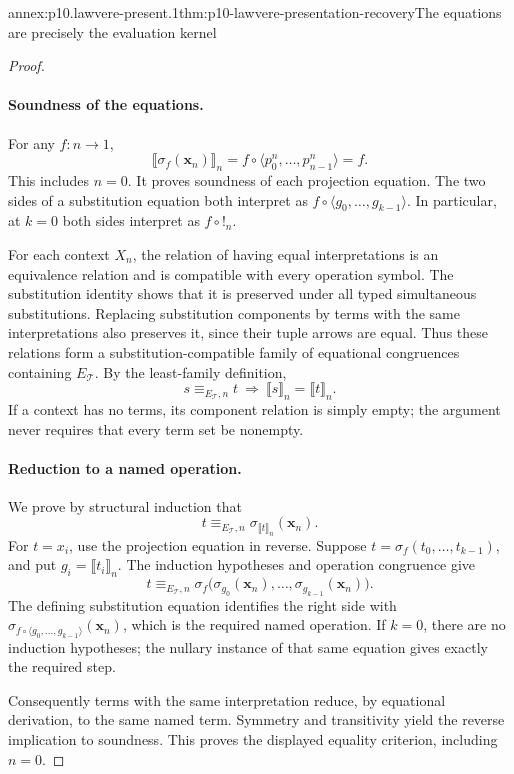 \begin{annexitem}{annex:p10.lawvere-present.1}{thm:p10-lawvere-presentation-recovery}{The equations are precisely the evaluation kernel}
\begin{proof}
\paragraph{Soundness of the equations.}
For any \(f:n\to1\),
\[
       \llbracket\sigma_f(\mathbf x_n)\rrbracket_n
             =f\circ\langle p_0^n,\ldots,p_{n-1}^n\rangle=f.
\]
This includes \(n=0\).
It proves soundness of each projection equation.
The two sides of a substitution equation both interpret as
\(f\circ\langle g_0,\ldots,g_{k-1}\rangle\).
In particular, at \(k=0\) both sides interpret as \(f\circ!_n\).

For each context \(X_n\), the relation of having equal
interpretations is an equivalence relation and is compatible
with every operation symbol.  The substitution identity shows
that it is preserved under all typed simultaneous substitutions.
Replacing substitution components by terms with the same
interpretations also preserves it, since their tuple arrows
are equal.  Thus these relations form a substitution-compatible
family of equational congruences containing \(E_{\mathcal T}\).
By the least-family definition,
\[
        s\equiv_{E_{\mathcal T},n}t
                        \ \Longrightarrow\
                     \llbracket s\rrbracket_n=\llbracket t\rrbracket_n.
\]
If a context has no terms, its component relation is simply empty;
the argument never requires that every term set be nonempty.

\paragraph{Reduction to a named operation.}
We prove by structural induction that
\[
             t\equiv_{E_{\mathcal T},n}
                           \sigma_{\llbracket t\rrbracket_n}(\mathbf x_n).
\]
For \(t=x_i\), use the projection equation in reverse.
Suppose \(t=\sigma_f(t_0,\ldots,t_{k-1})\), and put
\(g_i=\llbracket t_i\rrbracket_n\).  The induction hypotheses and
operation congruence give
\[
 t\equiv_{E_{\mathcal T},n}
       \sigma_f\bigl(\sigma_{g_0}(\mathbf x_n),\ldots,
                              \sigma_{g_{k-1}}(\mathbf x_n)\bigr).
\]
The defining substitution equation identifies the right side
with
\(\sigma_{f\circ\langle g_0,\ldots,g_{k-1}\rangle}(\mathbf x_n)\),
which is the required named operation.
If \(k=0\), there are no induction hypotheses; the nullary
instance of that same equation gives exactly the required step.

Consequently terms with the same interpretation reduce, by
equational derivation, to the same named term.  Symmetry and
transitivity yield the reverse implication to soundness.
This proves the displayed equality criterion, including \(n=0\).


\end{proof}
\end{annexitem}
